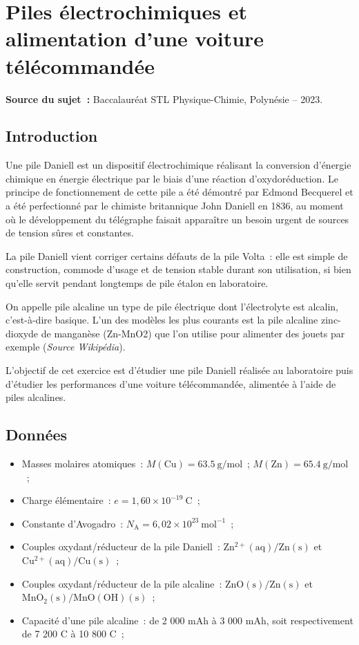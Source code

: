 \section{Piles électrochimiques et alimentation d'une voiture télécommandée}
\textbf{Source du sujet~:} Baccalauréat STL Physique-Chimie, Polynésie – 2023.

\subsection{Introduction}
Une pile Daniell est un dispositif électrochimique réalisant la conversion d'énergie chimique
en énergie électrique par le biais d'une réaction d'oxydoréduction. Le principe de
fonctionnement de cette pile a été démontré par Edmond Becquerel et a été perfectionné
par le chimiste britannique John Daniell en 1836, au moment où le développement du
télégraphe faisait apparaître un besoin urgent de sources de tension sûres et constantes.

La pile Daniell vient corriger certains défauts de la pile Volta~: elle est simple de
construction, commode d'usage et de tension stable durant son utilisation, si bien qu'elle
servit pendant longtemps de pile étalon en laboratoire.

On appelle pile alcaline un type de pile électrique dont l'électrolyte est alcalin, c’est-à-dire basique. L’un des modèles les plus courants est la pile alcaline zinc-dioxyde de manganèse (Zn-MnO2) que l’on utilise pour alimenter des jouets par exemple (\emph{Source
Wikipédia}).

\vspace{0.5cm}

L’objectif de cet exercice est d’étudier une pile Daniell réalisée au laboratoire puis d’étudier les performances d’une voiture télécommandée, alimentée à l’aide de piles alcalines.

\subsection{Données}
\begin{itemize}
    \item Masses molaires atomiques~: $M(\mathrm{Cu}) = \SI{63.5}{\gram\per\mole}$~; $M(\mathrm{Zn}) = \SI{65.4}{\gram\per\mole}$~;
    \item Charge élémentaire~: $e = 1,60 \times 10^{-19}\ \mathrm{C}$~;
    \item Constante d'Avogadro~: $N_{\mathrm{A}} = 6,02 \times 10^{23}\ \mathrm{mol}^{-1}$~;
    \item Couples oxydant/réducteur de la pile Daniell~: $\mathrm{Zn^{2+}(aq) / Zn(s)}$ et $\mathrm{Cu^{2+}(aq) / Cu(s)}$~;
    \item Couples oxydant/réducteur de la pile alcaline~: $\mathrm{ZnO(s) / Zn(s)}$ et $\mathrm{MnO_2(s) / MnO(OH)(s)}$~;
    \item Capacité d'une pile alcaline~: de 2 000 mAh à 3 000 mAh, soit respectivement de 7 200 C à 10 800 C~;
\end{itemize}

